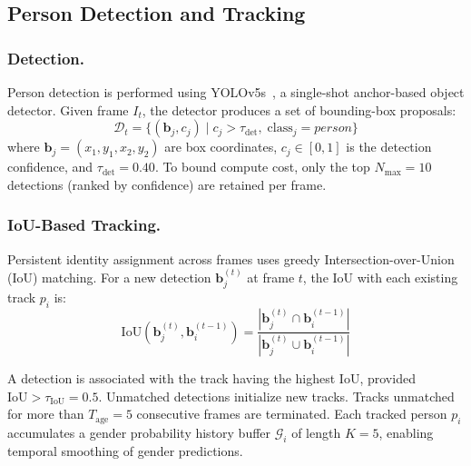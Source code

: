 \documentclass[11pt,a4paper]{article}
\begin{document}
\subsection{Person Detection and Tracking}
\label{subsec:detection}

\subsubsection{Detection.}
Person detection is performed using YOLOv5s~\cite{yolov5}, a single-shot anchor-based object detector. Given frame $I_t$, the detector produces a set of bounding-box proposals:
\begin{equation}
\mathcal{D}_t = \bigl\{(\mathbf{b}_j, c_j) \;\big|\; c_j > \tau_{\text{det}},\; \text{class}_j = \textit{person}\bigr\}
\end{equation}
where $\mathbf{b}_j = (x_1, y_1, x_2, y_2)$ are box coordinates, $c_j \in [0,1]$ is the detection confidence, and $\tau_{\text{det}} = 0.40$. To bound compute cost, only the top $N_{\max} = 10$ detections (ranked by confidence) are retained per frame.

\subsubsection{IoU-Based Tracking.}
Persistent identity assignment across frames uses greedy Intersection-over-Union (IoU) matching. For a new detection $\mathbf{b}_j^{(t)}$ at frame $t$, the IoU with each existing track $p_i$ is:
\begin{equation}
\text{IoU}(\mathbf{b}_j^{(t)}, \mathbf{b}_i^{(t-1)}) = \frac{|\mathbf{b}_j^{(t)} \cap \mathbf{b}_i^{(t-1)}|}{|\mathbf{b}_j^{(t)} \cup \mathbf{b}_i^{(t-1)}|}
\label{eq:iou}
\end{equation}

A detection is associated with the track having the highest IoU, provided $\text{IoU} > \tau_{\text{IoU}} = 0.5$. Unmatched detections initialize new tracks. Tracks unmatched for more than $T_{\text{age}} = 5$ consecutive frames are terminated. Each tracked person $p_i$ accumulates a gender probability history buffer $\mathcal{G}_i$ of length $K = 5$, enabling temporal smoothing of gender predictions.
\end{document}

